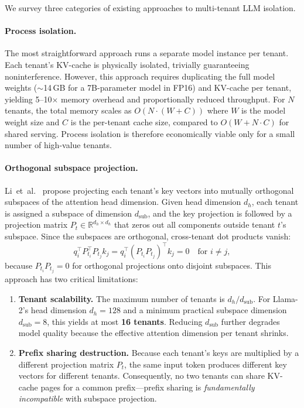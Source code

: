 \documentclass[11pt]{article}
\begin{document}
We survey three categories of existing approaches to multi-tenant LLM
isolation.

\paragraph{Process isolation.}
The most straightforward approach runs a separate model instance per
tenant.  Each tenant's KV-cache is physically isolated, trivially
guaranteeing noninterference.  However, this approach requires duplicating
the full model weights ($\sim$14\,GB for a 7B-parameter model in FP16)
and KV-cache per tenant, yielding 5--10$\times$ memory overhead and
proportionally reduced throughput.  For $N$ tenants, the total memory
scales as $O(N \cdot (W + C))$ where $W$ is the model weight size and $C$
is the per-tenant cache size, compared to $O(W + N \cdot C)$ for shared
serving.  Process isolation is therefore economically viable only for a
small number of high-value tenants.

\paragraph{Orthogonal subspace projection.}
Li~et~al.~\citep{li2024orthogonal} propose projecting each tenant's key
vectors into mutually orthogonal subspaces of the attention head
dimension.  Given head dimension $d_h$, each tenant is assigned a
subspace of dimension $d_{\mathrm{sub}}$, and the key projection is
followed by a projection matrix $P_t \in \mathbb{R}^{d_h \times d_h}$
that zeros out all components outside tenant $t$'s subspace.  Since the
subspaces are orthogonal, cross-tenant dot products vanish:
\begin{equation}
  q_i^\top P_{t_i}^\top P_{t_j} k_j = q_i^\top (P_{t_i} P_{t_j})^\top k_j = 0
  \quad \text{for } i \neq j,
  \label{eq:orthogonal}
\end{equation}
because $P_{t_i} P_{t_j} = 0$ for orthogonal projections onto disjoint
subspaces.  This approach has two critical limitations:
\begin{enumerate}[leftmargin=*,itemsep=2pt]
  \item \textbf{Tenant scalability.} The maximum number of tenants is
    $d_h / d_{\mathrm{sub}}$.  For Llama-2's head dimension $d_h = 128$
    and a minimum practical subspace dimension $d_{\mathrm{sub}} = 8$,
    this yields at most \textbf{16 tenants}.  Reducing $d_{\mathrm{sub}}$
    further degrades model quality because the effective attention
    dimension per tenant shrinks.
  \item \textbf{Prefix sharing destruction.} Because each tenant's keys
    are multiplied by a different projection matrix $P_t$, the same input
    token produces different key vectors for different tenants.
    Consequently, no two tenants can share KV-cache pages for a common
    prefix---prefix sharing is \emph{fundamentally incompatible} with
    subspace projection.
\end{enumerate}
\end{document}
